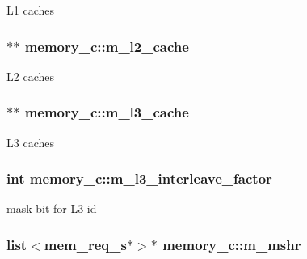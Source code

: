 \label{classmemory__c_a0bfafc54e9761b2ea991e668efb274c2}
L1 caches \hypertarget{classmemory__c_a3d8dc521d1b278422bbc42a2a2ef446e}{
\subsubsection[{m\_\-l2\_\-cache}]{$\ast$$\ast$ {\bf memory\_\-c::m\_\-l2\_\-cache}}}
\label{classmemory__c_a3d8dc521d1b278422bbc42a2a2ef446e}
L2 caches \hypertarget{classmemory__c_a3ec227755e32dad0987dc9f6ec6681fd}{
\subsubsection[{m\_\-l3\_\-cache}]{$\ast$$\ast$ {\bf memory\_\-c::m\_\-l3\_\-cache}}}
\label{classmemory__c_a3ec227755e32dad0987dc9f6ec6681fd}
L3 caches \hypertarget{classmemory__c_abcf822c7e709f6013963173b5a8f6041}{
\subsubsection[{m\_\-l3\_\-interleave\_\-factor}]{\setlength{\rightskip}{0pt plus 5cm}int {\bf memory\_\-c::m\_\-l3\_\-interleave\_\-factor}}}
\label{classmemory__c_abcf822c7e709f6013963173b5a8f6041}
mask bit for L3 id \hypertarget{classmemory__c_ab7b175ea316a51ff771ca652c2dae138}{
\subsubsection[{m\_\-mshr}]{\setlength{\rightskip}{0pt plus 5cm}list$<${\bf mem\_\-req\_\-s}$\ast$$>$$\ast$ {\bf memory\_\-c::m\_\-mshr}}}
